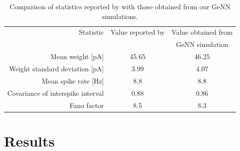 \documentclass[utf8]{frontiersSCNS} %
\begin{document}
\begin{table}
  \centering
  \begin{tabular}{r S S}
    \toprule
        {Statistic}                                     & {Value reported by}       & {Value obtained from} \\
                                                        & {\citet{Morrison2007}}    & {GeNN simulation} \\
    \midrule
        Mean weight [\si{\pico\ampere}]                 & 45.65                     & 46.25 \\
        Weight standard deviation [\si{\pico\ampere}]   & 3.99                      & 4.07 \\
        Mean spike rate [\si{\hertz}]                   & 8.8                       & 8.8 \\
        Covariance of interspike interval               & 0.88                      & 0.86 \\
        Fano factor                                     & 8.5                       & 8.3 \\
    \bottomrule
  \end{tabular}

  \caption{Comparison of statistics reported by \citet{Morrison2007} with those obtained from our GeNN simulations.}
  \label{tab:mad_stats}
\end{table}

\section{Results}
\end{document}
